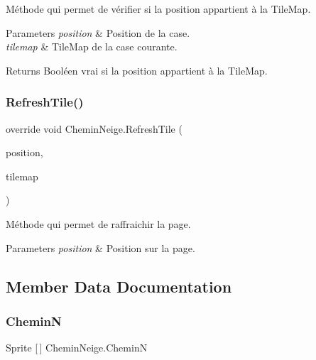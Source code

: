 Méthode qui permet de vérifier si la position appartient à la Tile\+Map. 
\begin{DoxyParams}{Parameters}
{\em position} & Position de la case. \\
\hline
{\em tilemap} & Tile\+Map de la case courante. \\
\hline
\end{DoxyParams}
\begin{DoxyReturn}{Returns}
Booléen vrai si la position appartient à la Tile\+Map. 
\end{DoxyReturn}
\mbox{\label{class_chemin_neige_accd4258086b766c710d5de5ad49b4eba}} 
\subsubsection{\texorpdfstring{Refresh\+Tile()}{RefreshTile()}}
{\footnotesize\ttfamily override void Chemin\+Neige.\+Refresh\+Tile (\begin{DoxyParamCaption}\item[{Vector3\+Int}]{position,  }\item[{I\+Tilemap}]{tilemap }\end{DoxyParamCaption})\hspace{0.3cm}{\ttfamily [inline]}}

Méthode qui permet de raffraichir la page. 
\begin{DoxyParams}{Parameters}
{\em position} & Position sur la page. \\
\hline
\end{DoxyParams}


\subsection{Member Data Documentation}
\mbox{\label{class_chemin_neige_ae02bf65481eb3ca35e8a2b1744b007c3}} 
\subsubsection{\texorpdfstring{CheminN}{CheminN}}
{\footnotesize\ttfamily Sprite \mbox{[}$\,$\mbox{]} Chemin\+Neige.\+CheminN\hspace{0.3cm}{\ttfamily [private]}}

